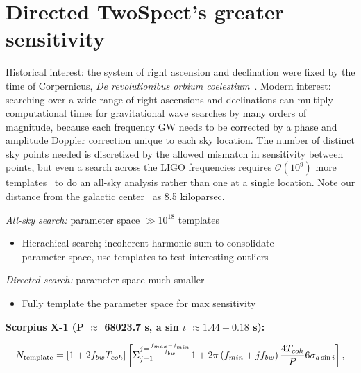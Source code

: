 

\section{Directed TwoSpect's greater sensitivity}

Historical interest: the system of right ascension and declination were fixed by the time of Corpernicus, \textit{De revolutionibus orbium coelestium}~\cite{Hawking2002}.
Modern interest: searching over a wide range of right ascensions and declinations can multiply computational times for gravitational wave searches by many orders of magnitude, because each frequency GW needs to be corrected by a phase and amplitude Doppler correction unique to each sky location.
The number of distinct sky points needed is discretized by the allowed mismatch in sensitivity between points, but even a search across the LIGO frequencies requires $\mathcal{O}(10^9)$ more templates~\cite{GoetzTwoSpectMethods2011} to do an all-sky analysis rather than one at a single location. 
Note our distance from the galactic center~\cite{KerrLyndenBell1986} as 8.5 kiloparsec.




\emph{All-sky search: }parameter space $\gg10^{18}$ templates
\begin{itemize}
\item Hierachical search; incoherent harmonic sum to consolidate\\
parameter space, use templates to test interesting outliers
\end{itemize}

\emph{Directed search: }parameter space much smaller
\begin{itemize}
\item Fully template the parameter space for max sensitivity
\end{itemize}

\textbf{Scorpius X-1 (P $\approx$$ $ 68023.7 s, a sin $\iota$ $\approx1.44\pm0.18$
s):}


\begin{equation}
N_{\textup{{template}}}=\left[1+2f_{bw}T_{coh}\right] \left[ {\displaystyle \Sigma}_{j=1}^{j = \frac{f_{max} - f_{min}}{f_{bw}}} 1 + 2\pi\left(f_{min} + j f_{bw}\right) \frac{4 T_{coh}}{P} 6 \sigma_{a \sin i} \right],
\label{N_template_full}
\end{equation}

